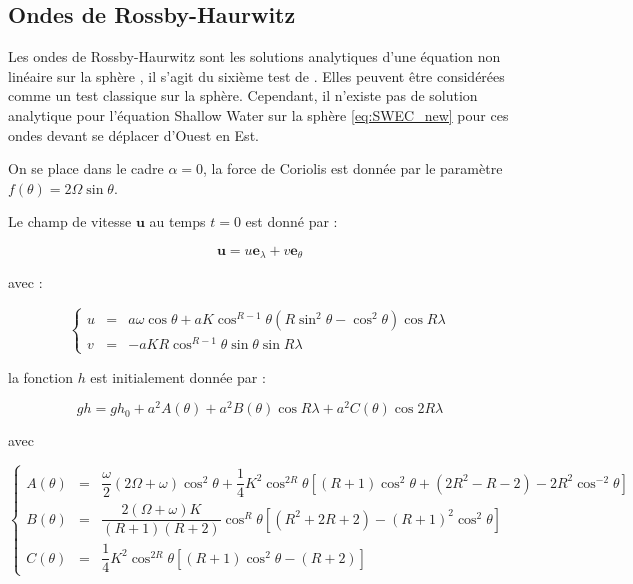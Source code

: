\subsection{Ondes de Rossby-Haurwitz}

Les ondes de Rossby-Haurwitz sont les solutions analytiques d'une équation non linéaire sur la sphère \cite{Haurwitz1940}, il s'agit du sixième test de \cite{Williamson1992}. Elles peuvent être considérées comme un test classique sur la sphère. Cependant, il n'existe pas de solution analytique pour l'équation Shallow Water sur la sphère \eqref{eq:SWEC_new} pour ces ondes devant se déplacer d'Ouest en Est.

On se place dans le cadre $\alpha = 0$, la force de Coriolis est donnée par le paramètre $f(\theta) = 2 \Omega \sin \theta$.

Le champ de vitesse $\mathbf{u}$ au temps $t=0$ est donné par :

\begin{equation}
\mathbf{u} = u \mathbf{e}_{\lambda} + v \mathbf{e}_{\theta}
\end{equation}

avec :

\begin{equation}
\left\lbrace
\begin{array}{rcl}
u & = & a \omega \cos \theta + a K \cos^{R-1} \theta \left( R \sin^2 \theta - \cos^2 \theta \right) \cos R \lambda\\
v & = & - a K R \cos^{R-1} \theta \sin \theta \sin R \lambda
\end{array}
\right.
\end{equation}

la fonction $h$ est initialement donnée par :

\begin{equation}
gh = gh_0 + a^2 A(\theta) + a^2 B(\theta) \cos R \lambda + a^2 C(\theta) \cos 2 R \lambda 
\end{equation}

avec

\begin{equation}
\left\{
\begin{array}{rcl}
A(\theta) & = & \dfrac{\omega}{2} \left( 2 \Omega + \omega \right) \cos^2 \theta + \dfrac{1}{4} K^2 \cos^{2R} \theta 
\left[ (R+1) \cos^2 \theta+ (2R^2 -R -2) - 2R^2 \cos^{-2} \theta \right]\\
B(\theta) & = & \dfrac{2 (\Omega +\omega) K }{(R+1)(R+2)} \cos^R \theta 
\left[ (R^2 + 2R +2) - (R+1)^2 \cos^2 \theta  \right] \\
C(\theta) & = & \dfrac{1}{4} K^2 \cos^{2R} \theta \left[ (R+1) \cos^2 \theta - (R+2) \right]
\end{array}
\right.
\end{equation}

